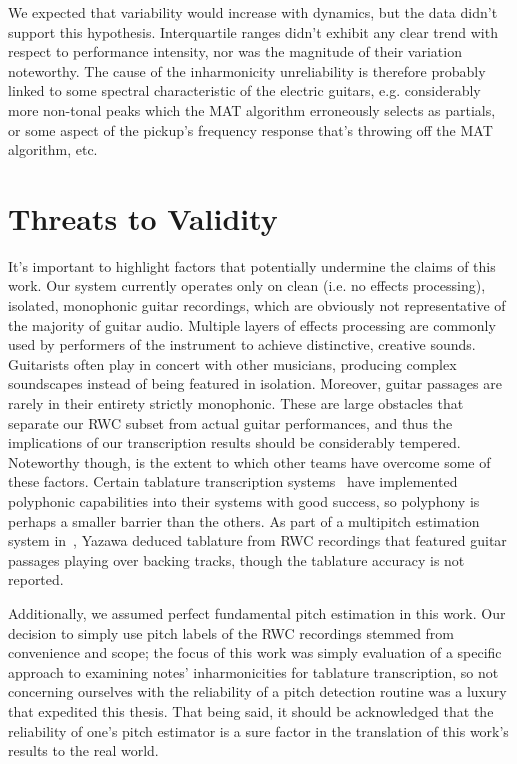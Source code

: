 \documentclass[12pt]{cmuthesis}
\begin{document}
We expected that variability would increase with dynamics, but the data didn't support this hypothesis. Interquartile ranges didn't exhibit any clear trend with respect to performance intensity, nor was the magnitude of their variation noteworthy. The cause of the inharmonicity unreliability is therefore probably linked to some spectral characteristic of the electric guitars, e.g. considerably more non-tonal peaks which the MAT algorithm erroneously selects as partials, or some aspect of the pickup's frequency response that's throwing off the MAT algorithm, etc.

\section{Threats to Validity}
It's important to highlight factors that potentially undermine the claims of this work. Our system currently operates only on clean (i.e. no effects processing), isolated, monophonic guitar recordings, which are obviously not representative of the majority of guitar audio. Multiple layers of effects processing are commonly used by performers of the instrument to achieve distinctive, creative sounds. Guitarists often play in concert with other musicians, producing complex soundscapes instead of being featured in isolation. Moreover, guitar passages are rarely in their entirety strictly monophonic. These are large obstacles that separate our RWC subset from actual guitar performances, and thus the implications of our transcription results should be considerably tempered. Noteworthy though, is the extent to which other teams have overcome some of these factors. Certain tablature transcription systems~\cite{barbanchoi2012,abesser2012,dittmar2013,kehling2014} have implemented polyphonic capabilities into their systems with good success, so polyphony is perhaps a smaller barrier than the others. As part of a multipitch estimation system in~\cite{yazawa2013}, Yazawa deduced tablature from RWC recordings that featured guitar passages playing over backing tracks, though the tablature accuracy is not reported.

Additionally, we assumed perfect fundamental pitch estimation in this work. Our decision to simply use pitch labels of the RWC recordings stemmed from convenience and scope; the focus of this work was simply evaluation of a specific approach to examining notes' inharmonicities for tablature transcription, so not concerning ourselves with the reliability of a pitch detection routine was a luxury that expedited this thesis. That being said, it should be acknowledged that the reliability of one's pitch estimator is a sure factor in the translation of this work's results to the real world.
\end{document}
